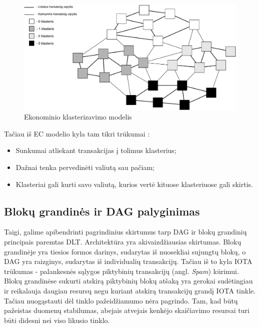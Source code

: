 \begin{figure}[H]
    \centering
    \includegraphics[scale=0.7]{images/economic-clusters}
    \caption{Ekonominio klasterizavimo modelis}
\end{figure}

Tačiau iš EC modelio kyla tam tikri trūkumai \cite{sergey2018economic}: 
\begin{itemize}
    \item Sunkumai atliekant transakcijas į tolimus klasterius;
    \item Dažnai tenka pervedinėti valiutą sau pačiam;
    \item Klasteriai gali kurti savo valiutą, kurios vertė kituose klasteriuose gali skirtis.
\end{itemize} 




\subsection{Blokų grandinės ir DAG palyginimas}

Taigi, galime apibendrinti pagrindinius skirtumus tarp DAG ir blokų grandinių principais paremtas DLT. Architektūra yra akivaizdžiausias skirtumas. Blokų grandinėje yra tiesios formos darinys, sudarytas iš nuosekliai sujungtų blokų, o DAG yra raizginys, sudarytas iš individualių transakcijų. Tačiau iš to kyla IOTA trūkumas - palankesnės sąlygos piktybinių transakcijų (angl. \textit{Spam}) kūrimui. Blokų grandinėse sukurti atskirą piktybinių blokų atšaką yra gerokai sudėtingiau ir reikalauja daugiau resursų negu kuriant atskirą transakcijų grandį IOTA tinkle. Tačiau nuogąstauti dėl tinklo pažeidžiamumo nėra pagrindo. Tam, kad būtų pažeistas duomenų stabilumas, abejais atvejais kenkėjo skaičiavimo resursai turi būti didesni nei viso likusio tinklo.

